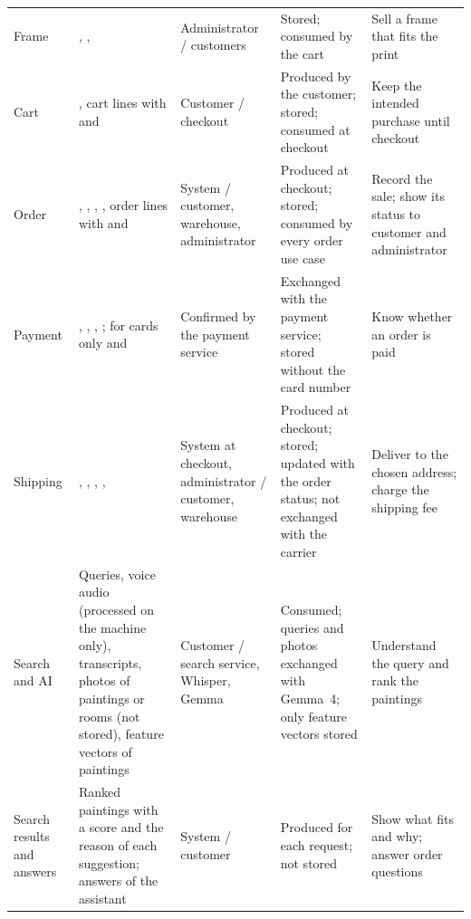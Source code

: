 \begin{longtable}{@{}P{2.3cm}P{4.3cm}P{2.5cm}P{2.9cm}P{3.0cm}@{}}
\small Frame & \small {}, ,  & \small Administrator / customers & \small Stored; consumed by the cart & \small Sell a frame that fits the print\\
\small Cart & \small {}, cart lines with  and  & \small Customer / checkout & \small Produced by the customer; stored; consumed at checkout & \small Keep the intended purchase until checkout\\
\small Order & \small {}, , , , order lines with  and  & \small System / customer, warehouse, administrator & \small Produced at checkout; stored; consumed by every order use case & \small Record the sale; show its status to customer and administrator\\
\small Payment & \small {}, , , ; for cards only  and  & \small Confirmed by the payment service & \small Exchanged with the payment service; stored without the card number & \small Know whether an order is paid\\
\small Shipping & \small {}, , , ,  & \small System at checkout, administrator / customer, warehouse & \small Produced at checkout; stored; updated with the order status; not exchanged with the carrier & \small Deliver to the chosen address; charge the shipping fee\\
\small Search and AI & \small Queries, voice audio (processed on the machine only), transcripts, photos of paintings or rooms (not stored), feature vectors of paintings & \small Customer / search service, Whisper, Gemma & \small Consumed; queries and photos exchanged with Gemma~4; only feature vectors stored & \small Understand the query and rank the paintings\\
\small Search results and answers & \small Ranked paintings with a score and the reason of each suggestion; answers of the assistant & \small System / customer & \small Produced for each request; not stored & \small Show what fits and why; answer order questions\\
\bottomrule
\end{longtable}

